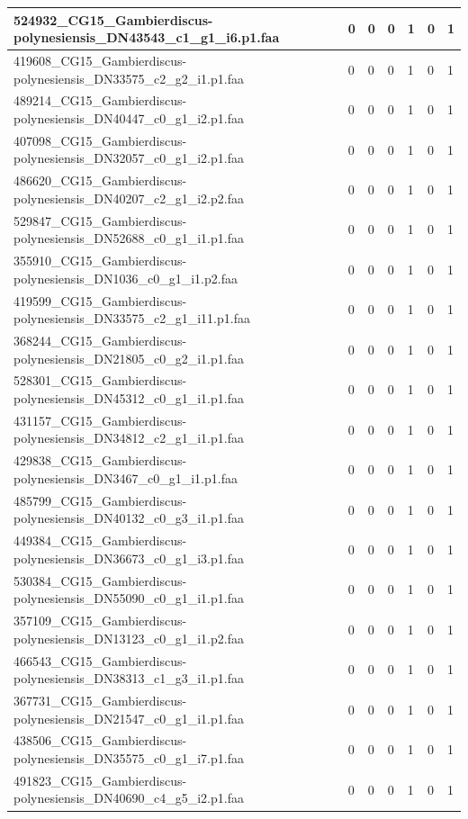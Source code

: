 \documentclass[12pt]{article}
\begin{document}
\begin{longtable}{ | p{2cm} | p{2cm} |p{2.5cm} | p{2cm} | p{2.5cm} |  p{2cm} | p{2cm} |}
 \hline 
524932\_CG15\_Gambierdiscus-polynesiensis\_DN43543\_c1\_g1\_i6.p1.faa&0&0&0&1&0&1\\ 
 \hline 
419608\_CG15\_Gambierdiscus-polynesiensis\_DN33575\_c2\_g2\_i1.p1.faa&0&0&0&1&0&1\\ 
 \hline 
489214\_CG15\_Gambierdiscus-polynesiensis\_DN40447\_c0\_g1\_i2.p1.faa&0&0&0&1&0&1\\ 
 \hline 
407098\_CG15\_Gambierdiscus-polynesiensis\_DN32057\_c0\_g1\_i2.p1.faa&0&0&0&1&0&1\\ 
 \hline 
486620\_CG15\_Gambierdiscus-polynesiensis\_DN40207\_c2\_g1\_i2.p2.faa&0&0&0&1&0&1\\ 
 \hline 
529847\_CG15\_Gambierdiscus-polynesiensis\_DN52688\_c0\_g1\_i1.p1.faa&0&0&0&1&0&1\\ 
 \hline 
355910\_CG15\_Gambierdiscus-polynesiensis\_DN1036\_c0\_g1\_i1.p2.faa&0&0&0&1&0&1\\ 
 \hline 
419599\_CG15\_Gambierdiscus-polynesiensis\_DN33575\_c2\_g1\_i11.p1.faa&0&0&0&1&0&1\\ 
 \hline 
368244\_CG15\_Gambierdiscus-polynesiensis\_DN21805\_c0\_g2\_i1.p1.faa&0&0&0&1&0&1\\ 
 \hline 
528301\_CG15\_Gambierdiscus-polynesiensis\_DN45312\_c0\_g1\_i1.p1.faa&0&0&0&1&0&1\\ 
 \hline 
431157\_CG15\_Gambierdiscus-polynesiensis\_DN34812\_c2\_g1\_i1.p1.faa&0&0&0&1&0&1\\ 
 \hline 
429838\_CG15\_Gambierdiscus-polynesiensis\_DN3467\_c0\_g1\_i1.p1.faa&0&0&0&1&0&1\\ 
 \hline 
485799\_CG15\_Gambierdiscus-polynesiensis\_DN40132\_c0\_g3\_i1.p1.faa&0&0&0&1&0&1\\ 
 \hline 
449384\_CG15\_Gambierdiscus-polynesiensis\_DN36673\_c0\_g1\_i3.p1.faa&0&0&0&1&0&1\\ 
 \hline 
530384\_CG15\_Gambierdiscus-polynesiensis\_DN55090\_c0\_g1\_i1.p1.faa&0&0&0&1&0&1\\ 
 \hline 
357109\_CG15\_Gambierdiscus-polynesiensis\_DN13123\_c0\_g1\_i1.p2.faa&0&0&0&1&0&1\\ 
 \hline 
466543\_CG15\_Gambierdiscus-polynesiensis\_DN38313\_c1\_g3\_i1.p1.faa&0&0&0&1&0&1\\ 
 \hline 
367731\_CG15\_Gambierdiscus-polynesiensis\_DN21547\_c0\_g1\_i1.p1.faa&0&0&0&1&0&1\\ 
 \hline 
438506\_CG15\_Gambierdiscus-polynesiensis\_DN35575\_c0\_g1\_i7.p1.faa&0&0&0&1&0&1\\ 
 \hline 
491823\_CG15\_Gambierdiscus-polynesiensis\_DN40690\_c4\_g5\_i2.p1.faa&0&0&0&1&0&1\\ 

\end{longtable}
\end{document}

